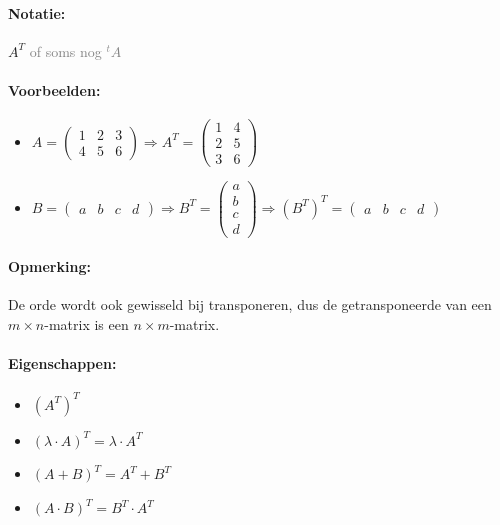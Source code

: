 \documentclass[12pt,twoside]{article}
\begin{document}
\paragraph*{Notatie:} $A^T$ \textcolor{gray}{of soms nog ${}^tA$}

\paragraph*{Voorbeelden:}
\begin{itemize}
\item $A=
  \begin{pmatrix}
    1 & 2 & 3\\
    4 & 5 & 6
  \end{pmatrix} \Rightarrow
  A^T=
  \begin{pmatrix}
    1 & 4\\
    2 & 5\\
    3 & 6
  \end{pmatrix}
  $
\item $B=
  \begin{pmatrix}
    a & b & c & d
  \end{pmatrix} \Rightarrow
  B^T=
  \begin{pmatrix}
    a\\
    b\\
    c\\
    d
  \end{pmatrix} \Rightarrow
  \left(B^T\right)^T=
  \begin{pmatrix}
    a & b & c & d
  \end{pmatrix}
  $
\end{itemize}

\paragraph*{Opmerking:} De orde wordt ook gewisseld bij transponeren, dus de getransponeerde van een $m \times n$-matrix is een $n \times m$-matrix.

\paragraph*{Eigenschappen:}
\begin{itemize}
\item $(A^T)^T$
\item $(\lambda \cdot A)^T=\lambda \cdot A^T$
\item $(A + B)^T = A^T + B^T$
\item $(A \cdot B)^T = B^T \cdot A^T$
\end{itemize}
\end{document}
